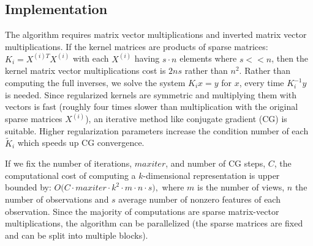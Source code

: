 


\subsection{Implementation}\label{subsec:implementation}
The algorithm requires matrix vector multiplications and inverted
matrix vector multiplications. If the kernel matrices are products of
sparse matrices: $K_i = X^{(i)T} X^{(i)}$ with each $X^{(i)}$ having
$s\cdot n$ elements
where $s << n$, then the kernel matrix vector multiplications cost is $2 n s$
rather than $n^2$. Rather than computing the full inverses, we solve
the system $K_i x = y$ for $x$, every time $K_i^{-1} y$ is needed. Since
regularized kernels are symmetric and multiplying them with vectors is
fast (roughly four times slower than multiplication with the original sparse matrices $X^{(i)}$), an iterative method like conjugate gradient (CG) is
suitable. Higher regularization parameters increase the condition
number of each $\tilde{K}_i$ which speeds up CG convergence.
\par
If we fix the number of iterations, $maxiter$, and number
of CG steps, $C$, the computational cost of computing a
$k$-dimensional representation is upper bounded by: $O\big(C \cdot
maxiter \cdot k^2 \cdot m \cdot n \cdot s \big),$ where $m$ is the
number of views, $n$ the number of observations and $s$ average number
of nonzero features of each observation.
%
Since the majority of computations are  sparse matrix-vector multiplications, the
algorithm can be parallelized (the sparse matrices are fixed and can be split into multiple
blocks).

